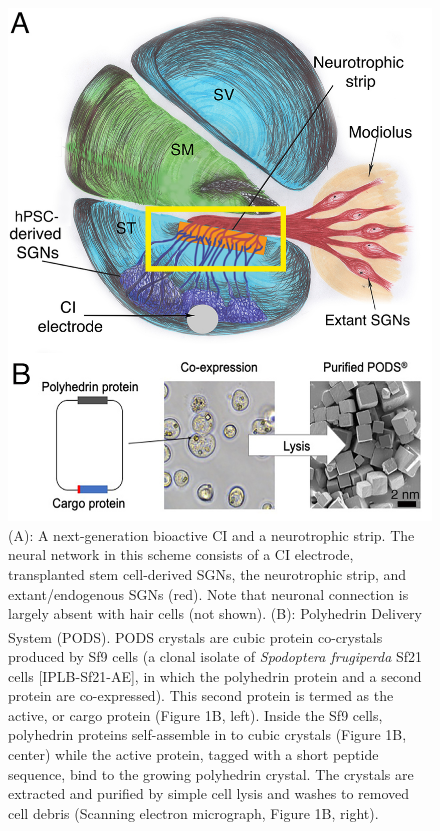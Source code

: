 \documentclass[review]{elsarticle}
\begin{document}
\begin{figure}
	\begin{center}
		\includegraphics[width=\textwidth]{Fig_1.jpg}
	\end{center}
	\caption{
		(A): A next-generation bioactive CI and a neurotrophic strip. The neural network in this scheme consists of a CI electrode, transplanted stem cell-derived SGNs, the neurotrophic strip, and extant/endogenous SGNs (red). Note that neuronal connection is largely absent with hair cells (not shown). (B): Polyhedrin Delivery System (PODS)\textsuperscript{\textregistered}. PODS\textsuperscript{\textregistered} crystals are cubic protein co-crystals produced by Sf9 cells (a clonal isolate of \textit{Spodoptera frugiperda} Sf21 cells [IPLB-Sf21-AE], in which the polyhedrin protein and a second protein are co-expressed). This second protein is termed as the active, or cargo protein (Figure 1B, left). Inside the Sf9 cells, polyhedrin proteins self-assemble in to cubic crystals (Figure 1B, center) while the active protein, tagged with a short peptide sequence, bind to the growing polyhedrin crystal. The crystals are extracted and purified by simple cell lysis and washes to removed cell debris (Scanning electron micrograph, Figure 1B, right).
	}
\end{figure}
\end{document}
